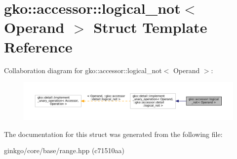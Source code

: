 \hypertarget{structgko_1_1accessor_1_1logical__not}{}\section{gko\+:\+:accessor\+:\+:logical\+\_\+not$<$ Operand $>$ Struct Template Reference}
\label{structgko_1_1accessor_1_1logical__not}


Collaboration diagram for gko\+:\+:accessor\+:\+:logical\+\_\+not$<$ Operand $>$\+:
\nopagebreak
\begin{figure}[H]
\begin{center}
\leavevmode
\includegraphics[width=350pt]{structgko_1_1accessor_1_1logical__not__coll__graph}
\end{center}
\end{figure}


The documentation for this struct was generated from the following file\+:\begin{DoxyCompactItemize}
\item 
ginkgo/core/base/range.\+hpp (c71510aa)\end{DoxyCompactItemize}
